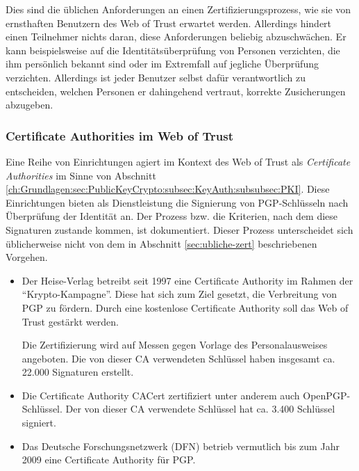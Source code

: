 Dies sind die üblichen Anforderungen an einen
Zertifizierungsprozess, wie sie von ernsthaften Benutzern des Web of
Trust erwartet werden. Allerdings hindert einen Teilnehmer nichts
daran, diese Anforderungen beliebig abzuschwächen. Er kann
beispielsweise auf die Identitätsüberprüfung von Personen
verzichten, die ihm persönlich bekannt sind oder im Extremfall auf
jegliche Überprüfung verzichten. Allerdings ist jeder Benutzer
selbst dafür verantwortlich zu entscheiden, welchen Personen er
dahingehend vertraut, korrekte Zusicherungen abzugeben.

\subsubsection{Certificate Authorities im Web of Trust}
\label{sec:cert-auth-im}

Eine Reihe von Einrichtungen agiert im Kontext des Web of Trust als
\emph{Certificate Authorities} im Sinne von Abschnitt
\ref{ch:Grundlagen:sec:PublicKeyCrypto:subsec:KeyAuth:subsubsec:PKI}. Diese
Einrichtungen bieten als Dienstleistung die Signierung von
PGP-Schlüsseln nach Überprüfung der Identität an. Der Prozess
bzw. die Kriterien, nach dem diese Signaturen zustande kommen, ist
dokumentiert. Dieser Prozess unterscheidet sich üblicherweise nicht
von dem in Abschnitt \ref{sec:ubliche-zert} beschriebenen Vorgehen.

\begin{itemize}
\item Der Heise-Verlag betreibt seit 1997 eine Certificate Authority
  im Rahmen der "`Krypto-Kampagne"'. Diese hat sich zum Ziel gesetzt,
  die Verbreitung von PGP zu fördern. Durch eine kostenlose
  Certificate Authority soll das Web of Trust gestärkt werden.

  Die Zertifizierung wird auf Messen gegen Vorlage des
  Personalausweises angeboten. Die von dieser CA verwendeten
  Schlüssel haben insgesamt ca. 22.000 Signaturen erstellt.
\item Die Certificate Authority CACert zertifiziert unter
  anderem auch OpenPGP-Schlüssel. Der von dieser CA verwendete
  Schlüssel hat ca. 3.400 Schlüssel signiert.
\item Das Deutsche Forschungsnetzwerk (DFN) betrieb vermutlich bis zum
  Jahr 2009 eine Certificate Authority für PGP.
\end{itemize}

